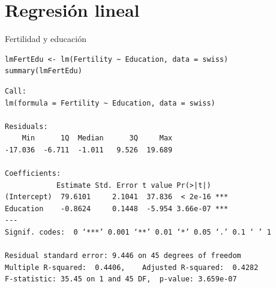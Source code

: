 \documentclass[xcolor={usenames,svgnames,dvipsnames}]{beamer}
\begin{document}
\section{Regresión lineal}
\label{sec-3}

\begin{frame}[fragile,label=sec-3-1]{Fertilidad y educación}
 \lstset{language=R,numbers=none}
\begin{lstlisting}
lmFertEdu <- lm(Fertility ~ Education, data = swiss)
summary(lmFertEdu)
\end{lstlisting}

\begin{verbatim}
Call:
lm(formula = Fertility ~ Education, data = swiss)

Residuals:
    Min      1Q  Median      3Q     Max 
-17.036  -6.711  -1.011   9.526  19.689 

Coefficients:
            Estimate Std. Error t value Pr(>|t|)    
(Intercept)  79.6101     2.1041  37.836  < 2e-16 ***
Education    -0.8624     0.1448  -5.954 3.66e-07 ***
---
Signif. codes:  0 ‘***’ 0.001 ‘**’ 0.01 ‘*’ 0.05 ‘.’ 0.1 ‘ ’ 1

Residual standard error: 9.446 on 45 degrees of freedom
Multiple R-squared:  0.4406,	Adjusted R-squared:  0.4282 
F-statistic: 35.45 on 1 and 45 DF,  p-value: 3.659e-07
\end{verbatim}
\end{frame}
\end{document}
